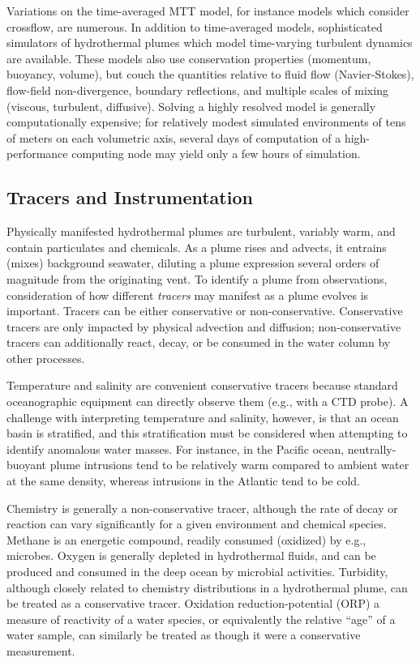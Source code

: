 Variations on the time-averaged MTT model, for instance models which consider crossflow\autocite{tohidi2016highly}, are numerous. In addition to time-averaged models, sophisticated simulators of hydrothermal plumes which model time-varying turbulent dynamics are available\autocite{lavelle2013turbulent}. These models also use conservation properties (momentum, buoyancy, volume), but couch the quantities relative to fluid flow (Navier-Stokes), flow-field non-divergence, boundary reflections, and multiple scales of mixing (viscous, turbulent, diffusive). Solving a highly resolved model is generally computationally expensive; for relatively modest simulated environments of tens of meters on each volumetric axis, several days of computation of a high-performance computing node may yield only a few hours of simulation.

\subsection{Tracers and Instrumentation}
Physically manifested hydrothermal plumes are turbulent, variably warm, and contain particulates and chemicals.
As a plume rises and advects, it entrains (mixes) background seawater, diluting a plume expression several orders of magnitude from the originating vent.
To identify a plume from observations, consideration of how different \emph{tracers} may manifest as a plume evolves is important.
Tracers can be either conservative or non-conservative. 
Conservative tracers are only impacted by physical advection and diffusion; non-conservative tracers can additionally react, decay, or be consumed in the water column by other processes.

Temperature and salinity are convenient conservative tracers because standard oceanographic equipment can directly observe them (e.g., with a CTD probe).
A challenge with interpreting temperature and salinity, however, is that an ocean basin is stratified, and this stratification must be considered when attempting to identify anomalous water masses. For instance, in the Pacific ocean, neutrally-buoyant plume intrusions tend to be relatively warm compared to ambient water at the same density, whereas intrusions in the Atlantic tend to be cold\autocite{speer1989model}.

Chemistry is generally a non-conservative tracer, although the rate of decay or reaction can vary significantly for a given environment and chemical species. Methane is an energetic compound, readily consumed (oxidized) by e.g., microbes\autocite{petersen2009methanotrophic}. Oxygen is generally depleted in hydrothermal fluids, and can be produced and consumed in the deep ocean by microbial activities\autocite{johnson1986situ,smith1985maerozooplankton}. Turbidity, although closely related to chemistry distributions in a hydrothermal plume, can be treated as a conservative tracer. Oxidation reduction-potential (ORP) a measure of reactivity of a water species, or equivalently the relative ``age'' of a water sample, can similarly be treated as though it were a conservative measurement.

